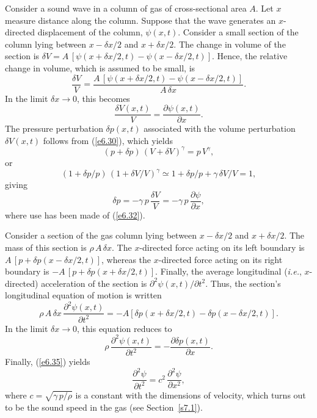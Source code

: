 Consider a sound wave in a column of gas of cross-sectional area $A$. Let $x$
measure distance along the column. Suppose that the wave generates an
$x$-directed displacement of the column, $\psi(x,t)$. Consider a small section of
the column lying between $x-\delta x/2$ and $x+\delta x/2$. The change in volume
of the section is $\delta V = A\,[\psi(x+\delta x/2,t)-\psi(x-\delta x/2,t)]$. 
Hence, the relative change in volume, which is assumed to be small, is
\begin{equation}
\frac{\delta V}{V} = \frac{A\,[\psi(x+\delta x/2,t)-\psi(x-\delta x/2,t)]}{A\,\delta x}.
\end{equation}
In the limit $\delta x\rightarrow 0$, this becomes
\begin{equation}\label{e6.32}
\frac{\delta V(x,t)}{V} = \frac{\partial\psi(x,t)}{\partial x}.
\end{equation}
The  pressure perturbation $\delta p(x,t)$ associated with the volume perturbation $\delta V(x,t)$ follows
from (\ref{e6.30}), which yields
\begin{equation}
(p+\delta p)\,(V+\delta V)^\gamma = p\,V^\gamma,
\end{equation}
or
\begin{equation}
(1+\delta p/p)\,(1+\delta V/V)^\gamma \simeq 1+ \delta p/p + \gamma\,\delta V/V=1,
\end{equation}
giving
\begin{equation}\label{e6.35}
\delta p = - \gamma\,p\,\frac{\delta V}{V}= -\gamma\,p\,\frac{\partial\psi}{\partial x},
\end{equation}
where use has been made of  (\ref{e6.32}).

Consider a section of the gas column lying between $x-\delta x/2$ and
$x+\delta x/2$. The mass of this section  is $\rho\,A\,\delta x$. The $x$-directed
force acting on its left boundary is $A\,[p+\delta p(x-\delta x/2,t)]$, whereas the
$x$-directed force acting on its right boundary is $-A\,[p+\delta p(x+\delta x/2,t)]$.
Finally, the average longitudinal ({\em i.e.}, $x$-directed) acceleration of the section is $\partial^2\psi(x,t)/\partial t^2$. 
Thus, the section's longitudinal equation of motion  is written
\begin{equation}
\rho\,A\,\delta x\,\frac{\partial^2\psi(x,t)}{\partial t^2} = -A\left[\delta p(x+\delta x/2,t)-\delta p(x-\delta x/2,t)\right].
\end{equation}
In the limit $\delta x\rightarrow 0$, this equation reduces to
\begin{equation}
\rho\,\frac{\partial^2\psi(x,t)}{\partial t^2} = - \frac{\partial\delta p(x,t)}{\partial x}.
\end{equation}
Finally, (\ref{e6.35}) yields
\begin{equation}\label{e6.38}
\frac{\partial^2\psi}{\partial t^2} = c^2\,\frac{\partial^2\psi}{\partial x^2},
\end{equation}
where $c=\sqrt{\gamma\,p/\rho}$ is a constant with the dimensions of velocity, which
turns out to be the sound speed in the gas (see Section~\ref{s7.1}).

